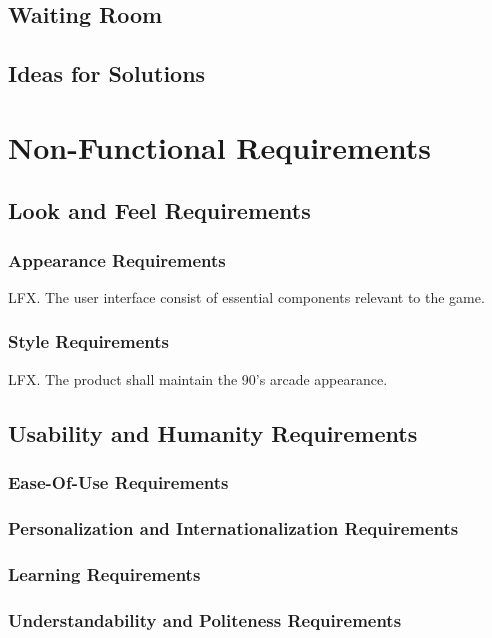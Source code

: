 \documentclass{article}
\begin{document}
\subsection{Waiting Room}
\subsection{Ideas for Solutions}





\section{Non-Functional Requirements}
    \subsection{Look and Feel Requirements}
        \subsubsection{Appearance Requirements}
        LFX. The user interface consist of essential components relevant to the game.\\
   
        
	\subsubsection{Style Requirements} 
        LFX. The product shall maintain the 90's arcade appearance.\\

\subsection{Usability and Humanity Requirements}
\subsubsection{Ease-Of-Use Requirements}
\subsubsection{Personalization and Internationalization Requirements}
\subsubsection{Learning Requirements}
\subsubsection{Understandability and Politeness Requirements}
\end{document}

